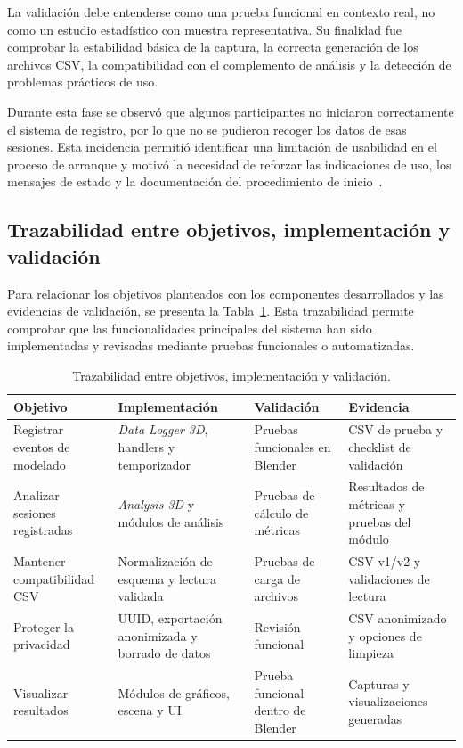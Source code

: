 La validación debe entenderse como una prueba funcional en contexto real, no como un estudio estadístico con muestra representativa. Su finalidad fue comprobar la estabilidad básica de la captura, la correcta generación de los archivos CSV, la compatibilidad con el complemento de análisis y la detección de problemas prácticos de uso.

Durante esta fase se observó que algunos participantes no iniciaron correctamente el sistema de registro, por lo que no se pudieron recoger los datos de esas sesiones. Esta incidencia permitió identificar una limitación de usabilidad en el proceso de arranque y motivó la necesidad de reforzar las indicaciones de uso, los mensajes de estado y la documentación del procedimiento de inicio~\cite{nielsen1994usability}.

\subsection{Trazabilidad entre objetivos, implementación y validación}

Para relacionar los objetivos planteados con los componentes desarrollados y las evidencias de validación, se presenta la Tabla~\ref{tab:trazabilidad-objetivos}. Esta trazabilidad permite comprobar que las funcionalidades principales del sistema han sido implementadas y revisadas mediante pruebas funcionales o automatizadas.

\begin{table}[H]
\centering
\small
\begin{tabularx}{\textwidth}{p{}p{}p{}X}
\toprule
\textbf{Objetivo} & \textbf{Implementación} & \textbf{Validación} & \textbf{Evidencia} \\
\midrule
Registrar eventos de modelado &
\textit{Data Logger 3D}, handlers y temporizador &
Pruebas funcionales en Blender &
CSV de prueba y checklist de validación \\

Analizar sesiones registradas &
\textit{Analysis 3D} y módulos de análisis &
Pruebas de cálculo de métricas &
Resultados de métricas y pruebas del módulo \\

Mantener compatibilidad CSV &
Normalización de esquema y lectura validada &
Pruebas de carga de archivos &
CSV v1/v2 y validaciones de lectura \\

Proteger la privacidad &
UUID, exportación anonimizada y borrado de datos &
Revisión funcional &
CSV anonimizado y opciones de limpieza \\

Visualizar resultados &
Módulos de gráficos, escena y UI &
Prueba funcional dentro de Blender &
Capturas y visualizaciones generadas \\
\bottomrule
\end{tabularx}
\caption{Trazabilidad entre objetivos, implementación y validación.}
\label{tab:trazabilidad-objetivos}
\end{table}

